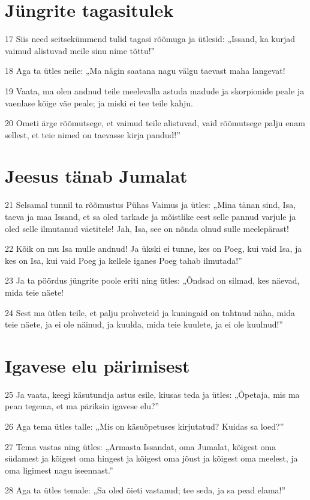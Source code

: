 \section*{Jüngrite tagasitulek}

\par 17 Siis need seitsekümmend tulid tagasi rõõmuga ja ütlesid: „Issand, ka kurjad vaimud alistuvad meile sinu nime tõttu!”
\par 18 Aga ta ütles neile: „Ma nägin saatana nagu välgu taevast maha langevat!
\par 19 Vaata, ma olen andnud teile meelevalla astuda madude ja skorpionide peale ja vaenlase kõige väe peale; ja miski ei tee teile kahju.
\par 20 Ometi ärge rõõmutsege, et vaimud teile alistuvad, vaid rõõmutsege palju enam sellest, et teie nimed on taevasse kirja pandud!”

\section*{Jeesus tänab Jumalat}

\par 21 Selsamal tunnil ta rõõmustus Pühas Vaimus ja ütles: „Mina tänan sind, Isa, taeva ja maa Issand, et sa oled tarkade ja mõistlike eest selle pannud varjule ja oled selle ilmutanud väetitele! Jah, Isa, see on nõnda olnud sulle meelepärast!
\par 22 Kõik on mu Isa mulle andnud! Ja ükski ei tunne, kes on Poeg, kui vaid Isa, ja kes on Isa, kui vaid Poeg ja kellele iganes Poeg tahab ilmutada!”
\par 23 Ja ta pöördus jüngrite poole eriti ning ütles: „Õndsad on silmad, kes näevad, mida teie näete!
\par 24 Sest ma ütlen teile, et palju prohveteid ja kuningaid on tahtnud näha, mida teie näete, ja ei ole näinud, ja kuulda, mida teie kuulete, ja ei ole kuulnud!”

\section*{Igavese elu pärimisest}

\par 25 Ja vaata, keegi käsutundja astus esile, kiusas teda ja ütles: „Õpetaja, mis ma pean tegema, et ma päriksin igavese elu?”
\par 26 Aga tema ütles talle: „Mis on käsuõpetuses kirjutatud? Kuidas sa loed?”
\par 27 Tema vastas ning ütles: „Armasta Issandat, oma Jumalat, kõigest oma südamest ja kõigest oma hingest ja kõigest oma jõust ja kõigest oma meelest, ja oma ligimest nagu iseennast.”
\par 28 Aga ta ütles temale: „Sa oled õieti vastanud; tee seda, ja sa pead elama!”

